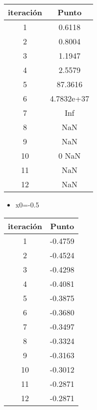 \documentclass{udpreport}
\begin{document}
\begin{enumerate}
\begin{enumerate}
\begin{table}[H]
\begin{tabular} { |c|c|}
        \hline
        iteración  &  Punto\\
        \hline
        1 &  0.6118        \\
         \hline
        2 &   0.8004       \\
         \hline
        3 &   1.1947       \\
         \hline
        4 &   2.5579      \\
         \hline
        5 &  87.3616      \\
         \hline
        6 & 4.7832e+37     \\
         \hline
        7 &  Inf         \\
         \hline
        8 &  NaN       \\
         \hline
        9 & NaN      \\
         \hline
        10 &  0 NaN       \\
         \hline
        11 &  NaN        \\
         \hline
        12 &   NaN        \\
        \hline
        
        \end{tabular}
    \end{table}
 
 \begin{itemize}
 \newpage
\item x0=-0.5
\end{itemize}
\begin{table}[H]
    \centering
        \begin{tabular} { |c|c|}
        
        \hline
        iteración  &  Punto\\
        \hline
        1 & -0.4759        \\
         \hline
        2 &  -0.4524        \\
         \hline
        3 &  -0.4298       \\
         \hline
        4 &   -0.4081      \\
         \hline
        5 &  -0.3875       \\
         \hline
        6 &   -0.3680     \\
         \hline
        7 &  -0.3497      \\
         \hline
        8 &  -0.3324       \\
         \hline
        9 &  -0.3163       \\
         \hline
        10 &  -0.3012       \\
         \hline
        11 &  -0.2871     \\
         \hline
        12 &  -0.2871       \\
        \hline
        \end{tabular}
\end{table}


\end{enumerate}
\end{enumerate}
\end{document}
